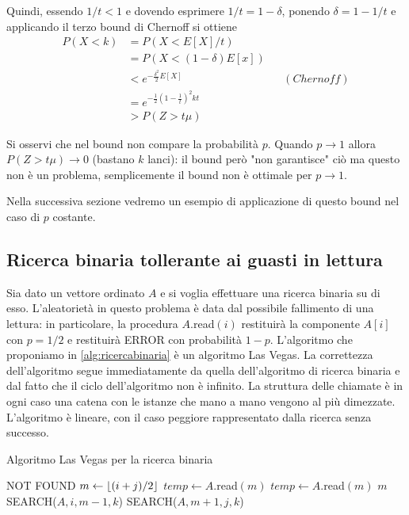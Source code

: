 Quindi, essendo $1/t<1$ e dovendo esprimere $1/t=1-\delta$, ponendo $\delta=1-1/t$ e applicando il terzo bound di Chernoff si ottiene
\begin{align*}
P(X<k)&=P(X<E[X]/t) \\
&=P(X<(1-\delta)E[x]) \\
&< e^{-\frac{\delta^2}{2}E[X]} && (Chernoff) \\
&= e^{-\frac{1}{2}\left(1-\frac{1}{t}\right)^2kt} \\
&>P(Z>t\mu)
\end{align*}

Si osservi che nel bound non compare la probabilità $p$. Quando $p\rightarrow 1$ allora $P(Z>t\mu)\rightarrow 0$ (bastano $k$ lanci): il bound però "non garantisce" ciò ma questo non è un problema, semplicemente il bound non è ottimale per $p\rightarrow 1$.

Nella successiva sezione vedremo un esempio di applicazione di questo bound nel caso di $p$ costante.

\subsection{Ricerca binaria tollerante ai guasti in lettura}
Sia dato un vettore ordinato $A$ e si voglia effettuare una ricerca binaria su di esso. L'aleatorietà in questo problema è data dal possibile fallimento di una lettura: in particolare, la procedura $A.$read$(i)$ restituirà la componente $A[i]$ con $p=1/2$ e restituirà ERROR con probabilità $1-p$. L'algoritmo che proponiamo in \ref{alg:ricercabinaria} è un algoritmo Las Vegas. La correttezza dell'algoritmo segue immediatamente da quella dell'algoritmo di ricerca binaria e dal fatto che il ciclo dell'algoritmo non è infinito. La struttura delle chiamate è in ogni caso una catena con le istanze che mano a mano vengono al più dimezzate. L'algoritmo è lineare, con il caso peggiore rappresentato dalla ricerca senza successo.

\begin{algorithm}
\caption{Algoritmo Las Vegas per la ricerca binaria}
\label{alg:ricercabinaria}
\begin{algorithmic}
		\State \Return NOT FOUND
	\EndIf
	\State $m\gets \lfloor(i+j)/2\rfloor$
	\State $temp\gets A.$read$(m)$
		\State $temp\gets A.$read$(m)$
	\EndWhile
		\State \Return $m$
	\EndIf
		\State \Return SEARCH($A,i,m-1,k$)
	\Else
		\State \Return SEARCH($A,m+1,j,k$)
	\EndIf
\EndFunction
\end{algorithmic}
\end{algorithm}

